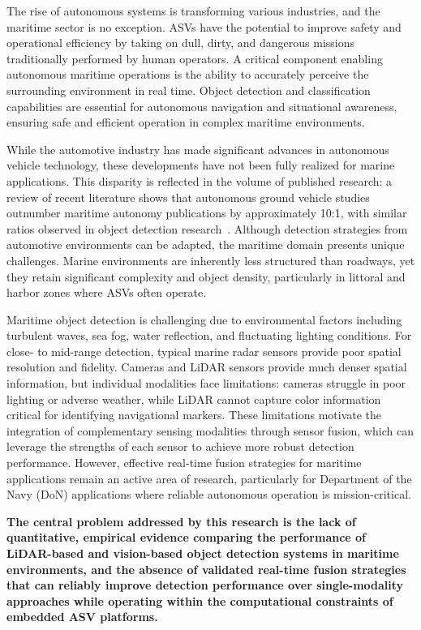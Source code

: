 \documentclass[../main.tex]{subfiles}
\begin{document}
The rise of autonomous systems is transforming various industries, and the maritime sector is no exception.
\ac{ASV}s have the potential to improve safety and operational efficiency by taking on dull, dirty, and dangerous missions traditionally performed by human operators.
A critical component enabling autonomous maritime operations is the ability to accurately perceive the surrounding environment in real time.
Object detection and classification capabilities are essential for autonomous navigation and situational awareness, ensuring safe and efficient operation in complex maritime environments.

While the automotive industry has made significant advances in autonomous vehicle technology, these developments have not been fully realized for marine applications.
This disparity is reflected in the volume of published research: a review of recent literature shows that autonomous ground vehicle studies outnumber maritime autonomy publications by approximately 10:1, with similar ratios observed in object detection research~\cite{Campbell2012, Bovcon2020}.
Although detection strategies from automotive environments can be adapted, the maritime domain presents unique challenges.
Marine environments are inherently less structured than roadways, yet they retain significant complexity and object density, particularly in littoral and harbor zones where \ac{ASV}s often operate.

Maritime object detection is challenging due to environmental factors including turbulent waves, sea fog, water reflection, and fluctuating lighting conditions.
For close- to mid-range detection, typical marine radar sensors provide poor spatial resolution and fidelity.
Cameras and \ac{LiDAR} sensors provide much denser spatial information, but individual modalities face limitations: cameras struggle in poor lighting or adverse weather, while \ac{LiDAR} cannot capture color information critical for identifying navigational markers.
These limitations motivate the integration of complementary sensing modalities through sensor fusion, which can leverage the strengths of each sensor to achieve more robust detection performance.
However, effective real-time fusion strategies for maritime applications remain an active area of research, particularly for Department of the Navy (\ac{DoN}) applications where reliable autonomous operation is mission-critical.

\textbf{The central problem addressed by this research is the lack of quantitative, empirical evidence comparing the performance of \ac{LiDAR}-based and vision-based object detection systems in maritime environments, and the absence of validated real-time fusion strategies that can reliably improve detection performance over single-modality approaches while operating within the computational constraints of embedded \ac{ASV} platforms.}
\end{document}
